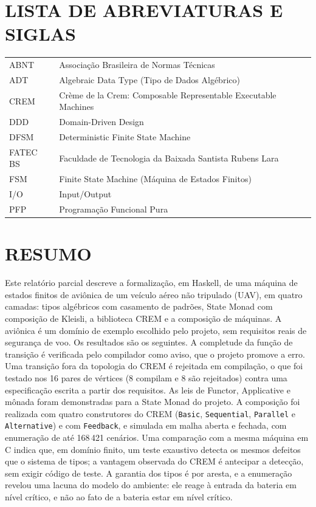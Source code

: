\documentclass[12pt,a4paper]{article}
\begin{document}
\newpage
\section*{LISTA DE ABREVIATURAS E SIGLAS}

\begin{tabular}{ll}
ABNT & Associação Brasileira de Normas Técnicas\\
ADT & Algebraic Data Type (Tipo de Dados Algébrico)\\
CREM & Crème de la Crem: Composable Representable Executable Machines\\
DDD & Domain-Driven Design\\
DFSM & Deterministic Finite State Machine\\
FATEC BS & Faculdade de Tecnologia da Baixada Santista Rubens Lara\\
FSM & Finite State Machine (Máquina de Estados Finitos)\\
I/O & Input/Output\\
PFP & Programação Funcional Pura\\
\end{tabular}

\newpage
\section*{RESUMO}

Este relatório parcial descreve a formalização, em Haskell, de uma máquina de estados finitos de aviônica de um veículo aéreo não tripulado (UAV), em quatro camadas: tipos algébricos com casamento de padrões, State Monad com composição de Kleisli, a biblioteca CREM e a composição de máquinas. A aviônica é um domínio de exemplo escolhido pelo projeto, sem requisitos reais de segurança de voo. Os resultados são os seguintes. A completude da função de transição é verificada pelo compilador como aviso, que o projeto promove a erro. Uma transição fora da topologia do CREM é rejeitada em compilação, o que foi testado nos 16 pares de vértices (8 compilam e 8 são rejeitados) contra uma especificação escrita a partir dos requisitos. As leis de Functor, Applicative e mônada foram demonstradas para a State Monad do projeto. A composição foi realizada com quatro construtores do CREM (\texttt{Basic}, \texttt{Sequential}, \texttt{Parallel} e \texttt{Alternative}) e com \texttt{Feedback}, e simulada em malha aberta e fechada, com enumeração de até 168\,421 cenários. Uma comparação com a mesma máquina em C indica que, em domínio finito, um teste exaustivo detecta os mesmos defeitos que o sistema de tipos; a vantagem observada do CREM é antecipar a detecção, sem exigir código de teste. A garantia dos tipos é por aresta, e a enumeração revelou uma lacuna do modelo do ambiente: ele reage à entrada da bateria em nível crítico, e não ao fato de a bateria estar em nível crítico.
\end{document}
